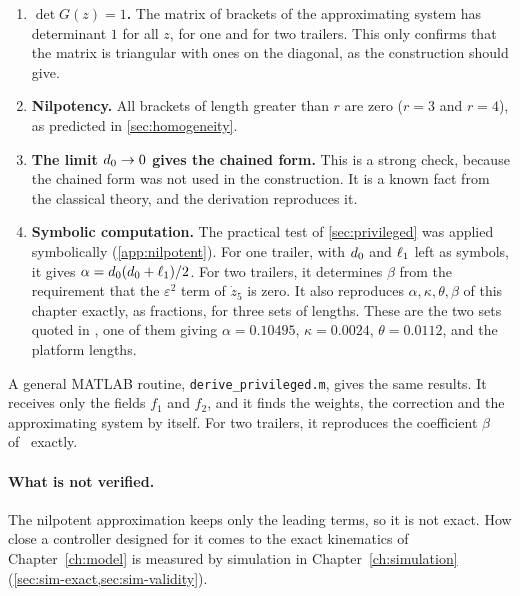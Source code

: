 \begin{enumerate}
  \item \textbf{$\det G(z)=1$.} The matrix of brackets of the approximating system
        has determinant $1$ for all $z$, for one and for two trailers. This only
        confirms that the matrix is triangular with ones on the diagonal, as the
        construction should give.
  \item \textbf{Nilpotency.} All brackets of length greater than $r$ are zero
        ($r=3$ and $r=4$), as predicted in \cref{sec:homogeneity}.
  \item \textbf{The limit $d_0\to0$ gives the chained form.} This is a strong
        check, because the chained form was not used in the construction. It is
        a known fact from the classical theory, and the derivation reproduces it.
  \item \textbf{Symbolic computation.} The practical test of
        \cref{sec:privileged} was applied symbolically (\cref{app:nilpotent}).
        For one trailer, with $d_0$ and $\ell_1$ left as symbols, it gives
        $\alpha=d_0(d_0+\ell_1)/2$. For two trailers, it determines $\beta$
        from the requirement that the $\varepsilon^2$ term of $\dot z_5$ is zero.
        It also reproduces $\alpha,\kappa,\theta,\beta$ of this chapter exactly,
        as fractions, for three sets of lengths. These are the two sets quoted in
        \cite{zuyev2024}, one of them giving $\alpha=0.10495$, $\kappa=0.0024$,
        $\theta=0.0112$, and the platform lengths.
\end{enumerate}
A general MATLAB routine, \texttt{derive\_privileged.m}, gives the same results.
It receives only the fields $f_1$ and $f_2$, and it finds the weights, the
correction and the approximating system by itself. For two trailers, it
reproduces the coefficient $\beta$ of~\cite{zuyev2024} exactly.

\paragraph{What is not verified.}
The nilpotent approximation keeps only the leading terms, so it is not exact. How
close a controller designed for it comes to the exact kinematics of
Chapter~\ref{ch:model} is measured by simulation in
Chapter~\ref{ch:simulation} (\cref{sec:sim-exact,sec:sim-validity}).
